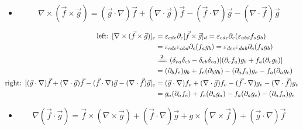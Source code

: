 \documentclass{article}
\begin{document}
\begin{itemize}
    \item $$\nabla\times(\vec{f}\times\vec{g})=(\vec{g}\cdot\nabla)\vec{f}+(\nabla\cdot\vec{g})\vec{f}-(\vec{f}\cdot\nabla)\vec{g}-(\nabla\cdot\vec{f})\vec{g}$$
\end{itemize}

$$\begin{aligned}
    \text{left: }[\nabla\times(\vec{f}\times\vec{g})]_{e}&=\varepsilon_{cde}\partial_{c}[\vec{f}\times\vec{g}]_{d}=\varepsilon_{cde}\partial_{c}(\varepsilon_{abd}f_{a}g_{b})\\
    &=\varepsilon_{cde}\varepsilon_{abd}\partial_{c}(f_{a}g_{b})=\varepsilon_{dec}\varepsilon_{dab}\partial_{c}(f_{a}g_{b})\\
    &\xlongequal{2.}(\delta_{ea}\delta_{cb}-\delta_{eb}\delta_{ca})[(\partial_{c}f_{a})g_{b}+f_{a}(\partial_{c}g_{b})]\\
    &=(\partial_{b}f_{e})g_{b}+f_{e}(\partial_{b}g_{b})-(\partial_{a}f_{a})g_{e}-f_{a}(\partial_{a}g_{e})\\
    \text{right: }[(\vec{g}\cdot\nabla)\vec{f}+(\nabla\cdot\vec{g})\vec{f}-(\vec{f}\cdot\nabla)\vec{g}-(\nabla\cdot\vec{f})\vec{g}]_e&=(\vec{g}\cdot\nabla)f_{e}+(\nabla\cdot\vec{g})f_{e}-(\vec{f}\cdot\nabla)g_{e}-(\nabla\cdot\vec{f})g_{e}\\
    &=g_a(\partial_{a}f_{e})+f_{e}(\partial_{a}g_{a})-f_{a}(\partial_{a}g_{e})-(\partial_{a}f_{a})g_{e}
\end{aligned}$$

\begin{itemize}
    \item $$\nabla(\vec{f}\cdot\vec{g})=\vec{f}\times(\nabla\times\vec{g})+(\vec{f}\cdot\nabla)\vec{g}+g\times(\nabla\times\vec{f})+(\vec{g}\cdot\nabla)\vec{f}$$
\end{itemize}
   
\end{document}
